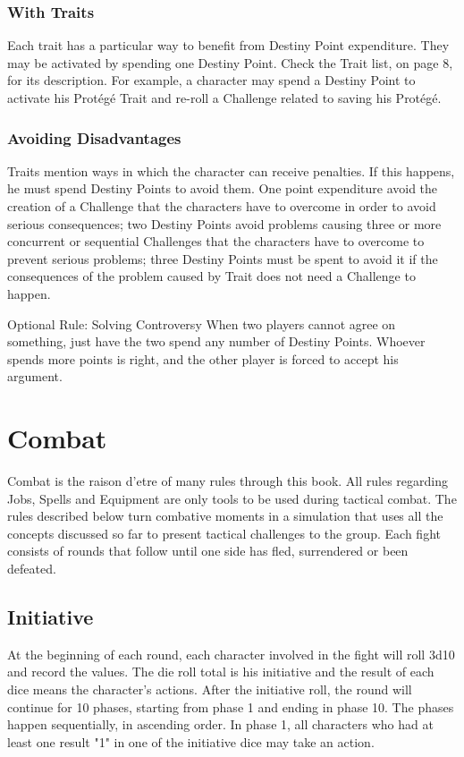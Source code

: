 \begin{multicols}{2}
\subsubsection{With Traits}
Each trait has a particular way to benefit
from Destiny Point expenditure. They may be
activated by spending one Destiny Point. Check the
Trait list, on page 8, for its description. For
example, a character may spend a Destiny Point to
activate his Protégé Trait and re-roll a Challenge
related to saving his Protégé.

\subsubsection{Avoiding Disadvantages}
Traits mention ways in which the
character can receive penalties. If this happens, he
must spend Destiny Points to avoid them. One
point expenditure avoid the creation of a
Challenge that the characters have to overcome in
order to avoid serious consequences; two Destiny
Points avoid problems causing three or more
concurrent or sequential Challenges that the
characters have to overcome to prevent serious
problems; three Destiny Points must be spent to
avoid it if the consequences of the problem caused
by Trait does not need a Challenge to happen.

Optional Rule: Solving Controversy
When two players cannot agree on
something, just have the two spend any number
of Destiny Points. Whoever spends more points
is right, and the other player is forced to accept
his argument.

\section{Combat}
Combat is the raison d’etre of many rules
through this book. All rules regarding Jobs, Spells
and Equipment are only tools to be used during
tactical combat. The rules described below turn
combative moments in a simulation that uses all
the concepts discussed so far to present tactical
challenges to the group. Each fight consists of
rounds that follow until one side has fled,
surrendered or been defeated.

\subsection{Initiative}
At the beginning of each round, each
character involved in the fight will roll 3d10 and
record the values. The die roll total is his initiative
and the result of each dice means the character's
actions. After the initiative roll, the round will
continue for 10 phases, starting from phase 1 and
ending in phase 10. The phases happen
sequentially, in ascending order. In phase 1, all
characters who had at least one result "1" in one of
the initiative dice may take an action.


\end{multicols}
